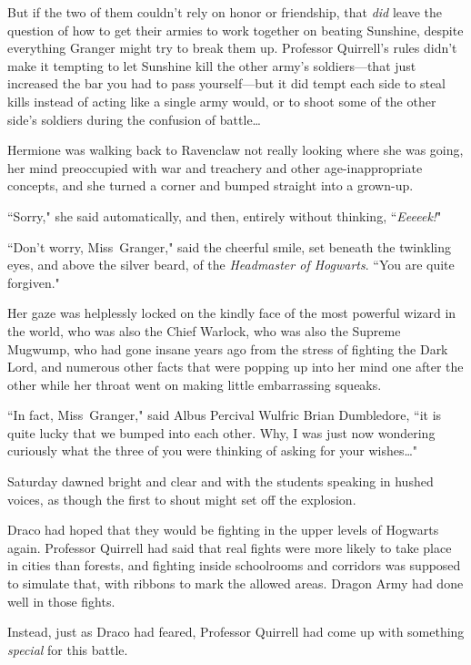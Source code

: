 But if the two of them couldn't rely on honor or friendship, that \emph{did} leave the question of how to get their armies to work together on beating Sunshine, despite everything Granger might try to break them up. Professor Quirrell's rules didn't make it tempting to let Sunshine kill the other army's soldiers—that just increased the bar you had to pass yourself—but it did tempt each side to steal kills instead of acting like a single army would, or to shoot some of the other side's soldiers during the confusion of battle{\ldots}

\later

Hermione was walking back to Ravenclaw not really looking where she was going, her mind preoccupied with war and treachery and other age-inappropriate concepts, and she turned a corner and bumped straight into a grown-up.

``Sorry," she said automatically, and then, entirely without thinking, ``\emph{Eeeeek!}"

``Don't worry, Miss~Granger," said the cheerful smile, set beneath the twinkling eyes, and above the silver beard, of the \emph{Headmaster of Hogwarts}. ``You are quite forgiven."

Her gaze was helplessly locked on the kindly face of the most powerful wizard in the world, who was also the Chief Warlock, who was also the Supreme Mugwump, who had gone insane years ago from the stress of fighting the Dark Lord, and numerous other facts that were popping up into her mind one after the other while her throat went on making little embarrassing squeaks.

``In fact, Miss~Granger," said Albus Percival Wulfric Brian Dumbledore, ``it is quite lucky that we bumped into each other. Why, I was just now wondering curiously what the three of you were thinking of asking for your wishes{\ldots}"

\later

Saturday dawned bright and clear and with the students speaking in hushed voices, as though the first to shout might set off the explosion.

\later

Draco had hoped that they would be fighting in the upper levels of Hogwarts again. Professor Quirrell had said that real fights were more likely to take place in cities than forests, and fighting inside schoolrooms and corridors was supposed to simulate that, with ribbons to mark the allowed areas. Dragon Army had done well in those fights.

Instead, just as Draco had feared, Professor Quirrell had come up with something \emph{special} for this battle.

